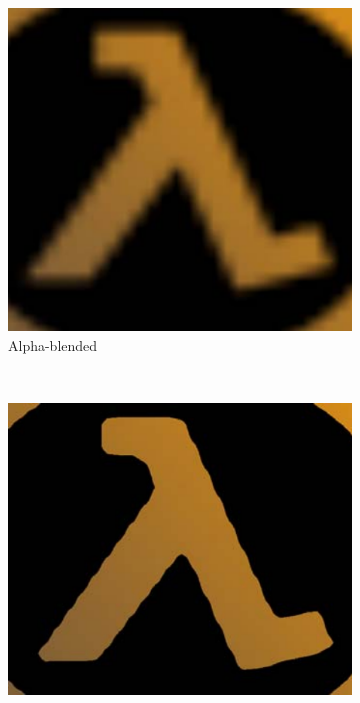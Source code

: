 \begin{figure}[!h]
    \centering
    \begin{subfigure}[b]{0.27\textwidth}
        \includegraphics[width=\textwidth]{Theory/Figs/ValveAlphaBlended.png}
        \caption{Alpha-blended}
        \label{fig:valveA}
    \end{subfigure}
    ~
    \begin{subfigure}[b]{0.3\textwidth}
        \includegraphics[width=\textwidth]{Theory/Figs/ValveAlphaTested.png}

\end{subfigure}
\end{figure}

